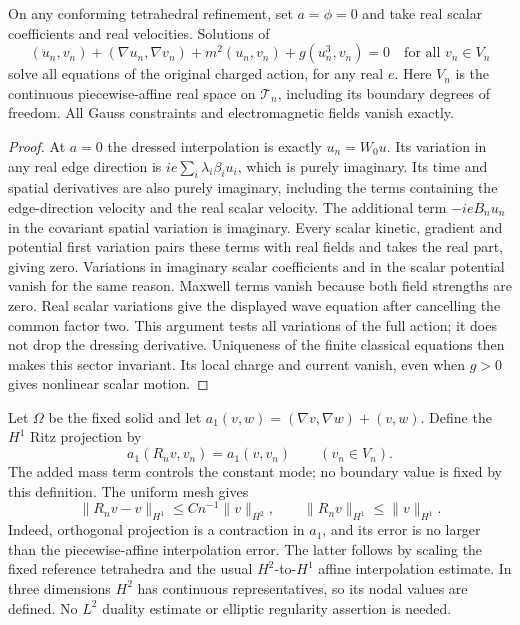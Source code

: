 \begin{lemma}
\label{lem:whitney-real-sector-invariant}
On any conforming tetrahedral refinement, set \(a=\phi=0\) and
take real scalar coefficients and real velocities. Solutions of
\begin{equation}
 (\ddot u_n,v_n)+(\nabla u_n,\nabla v_n)
       +m^2(u_n,v_n)+g(u_n^3,v_n)=0
 \quad\text{for all }v_n\in V_n
 \label{eq:whitney-real-discrete-wave}
\end{equation}
solve all equations of the original charged action, for any real \(e\).
Here \(V_n\) is the continuous piecewise-affine real space on
\(\mathcal T_n\), including its boundary degrees of freedom.
All Gauss constraints and electromagnetic fields vanish exactly.
\end{lemma}
\begin{proof}
At \(a=0\) the dressed interpolation is exactly \(u_n=W_0u\).
Its variation in any real edge direction is
\(ie\sum_i\lambda_i\beta_i u_i\), which is purely imaginary.
Its time and spatial derivatives are also purely imaginary, including
the terms containing the edge-direction velocity and the real scalar
velocity. The additional term \(-ieB_nu_n\) in the covariant spatial
variation is imaginary. Every scalar kinetic, gradient and potential
first variation pairs these terms with real fields and takes the real
part, giving zero. Variations in imaginary scalar coefficients and in
the scalar potential vanish for the same reason. Maxwell terms vanish
because both field strengths are zero. Real scalar variations give the
displayed wave equation after cancelling the common factor two.
This argument tests all variations of the full action; it does not drop
the dressing derivative. Uniqueness of the finite classical equations
then makes this sector invariant. Its local charge and current vanish,
even when \(g>0\) gives nonlinear scalar motion.
\end{proof}

Let \(\Omega\) be the fixed solid and let
\(a_1(v,w)=(\nabla v,\nabla w)+(v,w)\).
Define the \(H^1\) Ritz projection by
\begin{equation}
 a_1(R_nv,v_n)=a_1(v,v_n)\qquad(v_n\in V_n).
 \label{eq:whitney-real-ritz-projection}
\end{equation}
The added mass term controls the constant mode; no boundary value is
fixed by this definition. The uniform mesh gives
\begin{equation}
 \|R_nv-v\|_{H^1}\leq Cn^{-1}\|v\|_{H^2},
 \qquad \|R_nv\|_{H^1}\leq\|v\|_{H^1}.
 \label{eq:whitney-real-ritz-estimate}
\end{equation}
Indeed, orthogonal projection is a contraction in \(a_1\), and its
error is no larger than the piecewise-affine interpolation error. The
latter follows by scaling the fixed reference tetrahedra and the usual
\(H^2\)-to-\(H^1\) affine interpolation estimate. In three dimensions
\(H^2\) has continuous representatives, so its nodal values are defined.
No \(L^2\) duality estimate or elliptic regularity assertion is needed.

